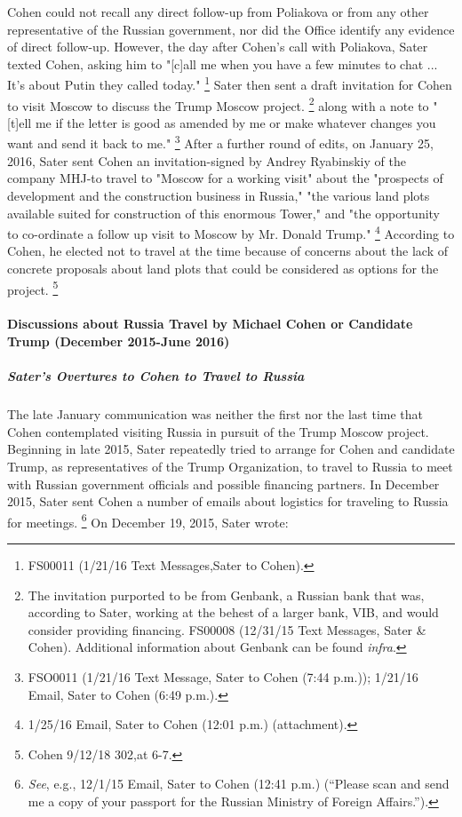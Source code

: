 Cohen could not recall any direct follow-up from Poliakova or from any other representative of the Russian government, nor did the Office identify any evidence of direct follow-up.
However, the day after Cohen's call with Poliakova, Sater texted Cohen, asking him to "[c]all me when you have a few minutes to chat ... It's about Putin they called today."%
\footnote{FS00011 (1/21/16 Text Messages,Sater to Cohen).}
Sater then sent a draft invitation for Cohen to visit Moscow to discuss the Trump Moscow project.%
\footnote{The invitation purported to be from Genbank, a Russian bank that was, according to Sater, working at the behest of a larger bank, VIB, and would consider providing financing.
FS00008 (12/31/15 Text Messages, Sater \& Cohen).
Additional information about Genbank can be found \textit{infra}.}
along with a note to "[t]ell me if the letter is good as amended by me or make whatever changes you want and send it back to me."%
\footnote{FSO0011 (1/21/16 Text Message, Sater to Cohen (7:44 p.m.));
1/21/16 Email, Sater to Cohen (6:49 p.m.).}
After a further round of edits, on January 25, 2016, Sater sent Cohen an invitation-signed by Andrey Ryabinskiy of the company MHJ-to travel to "Moscow for a working visit" about the "prospects of development and the construction business in Russia," "the various land plots available suited for construction of this enormous Tower," and "the opportunity to co-ordinate a follow up visit to Moscow by Mr. Donald Trump."%
\footnote{1/25/16 Email, Sater to Cohen (12:01 p.m.) (attachment).}
According to Cohen, he elected not to travel at the time because of concerns about the lack of concrete proposals about land plots that could be considered as options for the project.%
\footnote{Cohen 9/12/18 302,at 6-7.}

\paragraph{Discussions about Russia Travel by Michael Cohen or Candidate Trump (December 2015-June 2016)}

\subparagraph{Sater's Overtures to Cohen to Travel to Russia}

The late January communication was neither the first nor the last time that Cohen contemplated visiting Russia in pursuit of the Trump Moscow project.
Beginning in late 2015, Sater repeatedly tried to arrange for Cohen and candidate Trump, as representatives of the Trump Organization, to travel to Russia to meet with Russian government officials and possible financing partners.
In December 2015, Sater sent Cohen a number of emails about logistics for traveling to Russia for meetings.%
\footnote{\textit{See}, e.g., 12/1/15 Email, Sater to Cohen (12:41 p.m.)
(“Please scan and send me a copy of your passport for the Russian Ministry of Foreign Affairs.”).}
On December 19, 2015, Sater wrote:

